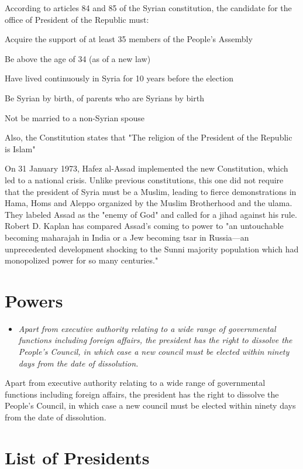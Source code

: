 According to articles 84 and 85 of the Syrian constitution, the
candidate for the office of President of the Republic must:

Acquire the support of at least 35 members of the People's Assembly

Be above the age of 34 (as of a new law)

Have lived continuously in Syria for 10 years before the election

Be Syrian by birth, of parents who are Syrians by birth

Not be married to a non-Syrian spouse

Also, the Constitution states that "The religion of the President of the
Republic is Islam"

On 31 January 1973, Hafez al-Assad implemented the new Constitution,
which led to a national crisis. Unlike previous constitutions, this one
did not require that the president of Syria must be a Muslim, leading to
fierce demonstrations in Hama, Homs and Aleppo organized by the Muslim
Brotherhood and the ulama. They labeled Assad as the "enemy of God" and
called for a jihad against his rule. Robert D. Kaplan has compared
Assad's coming to power to "an untouchable becoming maharajah in India
or a Jew becoming tsar in Russia---an unprecedented development shocking
to the Sunni majority population which had monopolized power for so many
centuries."

\section{Powers}\label{powers}

\begin{itemize}
\item
  \emph{Apart from executive authority relating to a wide range of
  governmental functions including foreign affairs, the president has
  the right to dissolve the People's Council, in which case a new
  council must be elected within ninety days from the date of
  dissolution.}
\end{itemize}

Apart from executive authority relating to a wide range of governmental
functions including foreign affairs, the president has the right to
dissolve the People's Council, in which case a new council must be
elected within ninety days from the date of dissolution.

\section{List of Presidents}\label{list-of-presidents}

